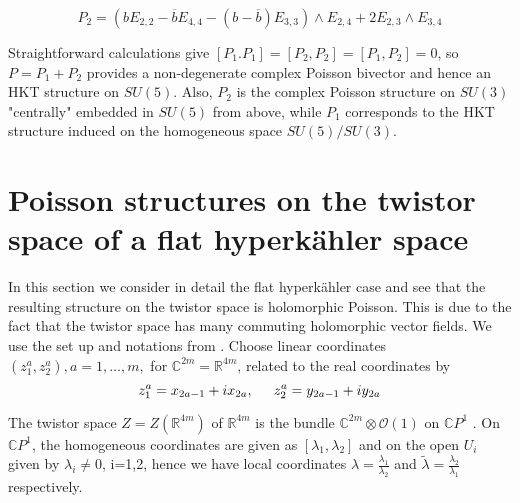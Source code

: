 \documentclass[11pt,oneside,leqno]{amsart}
\theoremstyle{plain}
\theoremstyle{definition}
\begin{document}
$$P_2 = (bE_{2,2}-\overline{b}E_{4,4}-(b-\overline{b})E_{3,3})\wedge E_{2,4}+2E_{2,3}\wedge E_{3,4}$$

Straightforward calculations give $[P_1.P_1]=[P_2,P_2]=[P_1,P_2]=0$, so $P = P_1+P_2$ provides a non-degenerate complex Poisson bivector and hence an HKT structure on $SU(5)$. Also, $P_2$ is the complex Poisson structure on $SU(3)$ "centrally" embedded in $SU(5)$ from above, while $P_1$ corresponds to the HKT structure induced on the homogeneous space $SU(5)/SU(3)$.

\section{Poisson structures on the twistor space of a flat hyperk\"ahler space}
In this section we consider in detail the flat hyperk\"ahler case and see that the resulting structure on the twistor space is holomorphic Poisson. This is due to the fact that the twistor space has many commuting holomorphic vector fields. We use the set up and notations from \cite{GPP}. Choose linear coordinates $(z_1^a, z_2^a), a=1, \dots, m,$
  for $\mathbb{C}^{2m}=\mathbb{R}^{4m}$, related to the real coordinates by
$$
  z_1^a=x_{2a-1}+ix_{2a},
  \hspace{.2in}
  z_2^a=y_{2a-1}+iy_{2a}
$$

  The twistor space $Z=Z(\mathbb{R}^{4m})$ of $\mathbb{R}^{4m}$ is the bundle
  $\mathbb{C}^{2m}\otimes \mathcal{O}(1)$ on $\mathbb{C}P^1$
  \cite[Example 13.64 and Example 13.66]{Bes}.
On  $\mathbb{C}P^1$, the homogeneous coordinates are given as $[\lambda_1,\lambda_2]$ and on the open $U_i$ given by $\lambda_i\neq 0$, i=1,2, hence we have local coordinates $\lambda = \frac{\lambda_1}{\lambda_2}$ and $\tilde{\lambda}=\frac{\lambda_2}{\lambda_1}$ respectively.
\end{document}
